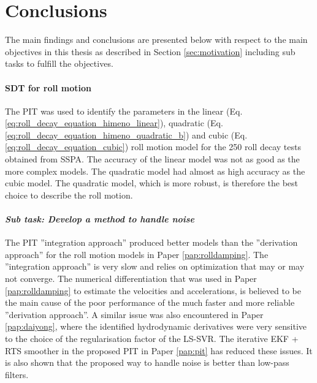 \chapter{Conclusions\label{ch:conclusions}}
The main findings and conclusions are presented below with respect to the main objectives in this thesis as described in Section \ref{sec:motivation} including sub tasks to fulfill the objectives.

\subsubsection*{SDT for roll motion}
The PIT was used to identify the parameters in the linear (Eq.\ref{eq:roll_decay_equation_himeno_linear}), quadratic (Eq.\ref{eq:roll_decay_equation_himeno_quadratic_b}) and cubic (Eq.\ref{eq:roll_decay_equation_cubic}) roll motion model for the 250 roll decay tests obtained from SSPA. 
The accuracy of the linear model was not as good as the more complex models. The quadratic model had almost as high accuracy as the cubic model. The quadratic model, which is more robust, is therefore the best choice to describe the roll motion. 

\subsubsection*{\emph{Sub task: Develop a method to handle noise}}
The PIT ''integration approach'' produced better models than the ''derivation approach'' for the roll motion models in Paper \ref{pap:rolldamping}. The ''integration approach'' is very slow and relies on optimization that may or may not converge.
The numerical differentiation that was used in Paper \ref{pap:rolldamping} to estimate the velocities and accelerations, is believed to be the main cause of the poor performance of the much faster and more reliable ''derivation approach''. A similar issue was also encountered in Paper \ref{pap:daiyong}, where the identified hydrodynamic derivatives were very sensitive to the choice of the regularisation factor of the LS-SVR.
The iterative EKF + RTS smoother in the proposed PIT in Paper \ref{pap:pit} has reduced these issues. It is also shown that the proposed way to handle noise is better than low-pass filters.

